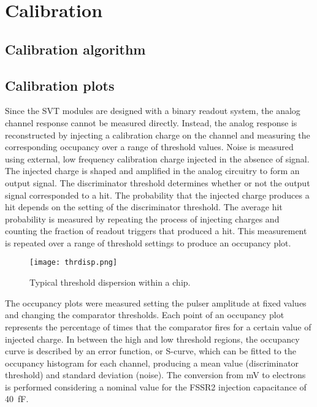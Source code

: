 \section{Calibration}

\subsection{Calibration algorithm}
\subsection{Calibration plots}

Since the SVT modules are designed with a binary readout system, the analog channel response cannot be measured directly. Instead, the analog response is reconstructed by injecting a calibration charge on the channel and measuring the corresponding occupancy over a range of threshold values. Noise is measured using external, low frequency calibration charge injected in the absence of signal. The injected charge is shaped and amplified in the analog circuitry to form an output signal. The discriminator threshold determines whether or not the output signal corresponded to a hit. The probability that the injected charge produces a hit depends on the setting of the discriminator threshold. The average hit probability is measured by repeating the process of injecting charges and counting the fraction of readout triggers that produced a hit. This measurement is repeated over a range of threshold settings to produce an occupancy plot. 

\begin{figure}[hbt] 
	\centering 
	\texttt{[image: thrdisp.png]}
	\caption{Typical threshold dispersion within a chip.}
	\label{fig:thrdisp}
\end{figure}

The occupancy plots were measured setting the pulser amplitude at fixed values and changing the comparator thresholds. Each point of an occupancy plot represents the percentage of times that the comparator fires for a certain value of injected charge. In between the high and low threshold regions, the occupancy curve is described by an error function, or S-curve, which can be fitted to the occupancy histogram for each channel, producing a mean value (discriminator threshold) and standard deviation (noise). The conversion from mV to electrons is performed considering a nominal value for the FSSR2 injection capacitance of 40~fF. 

